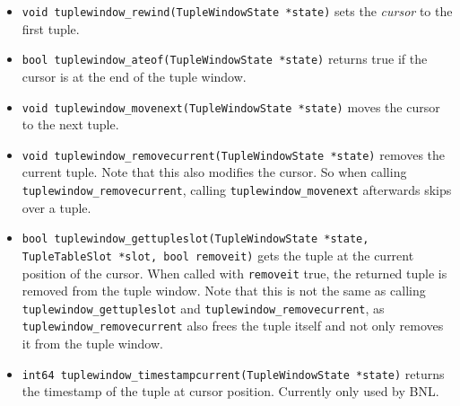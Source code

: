 \begin{itemize}
\item \lstinline|void tuplewindow_rewind(TupleWindowState *state)|
sets the \emph{cursor} to the first tuple.

\item \lstinline|bool tuplewindow_ateof(TupleWindowState *state)|
returns true if the cursor is at the end of the tuple window.

\item \lstinline|void tuplewindow_movenext(TupleWindowState *state)|
moves the cursor to the next tuple.

\item \lstinline|void tuplewindow_removecurrent(TupleWindowState *state)|
removes the current tuple.  Note that this also modifies the cursor.
So when calling \lstinline|tuplewindow_removecurrent|, calling
\lstinline|tuplewindow_movenext| afterwards skips over a tuple.

\item \lstinline|bool tuplewindow_gettupleslot(TupleWindowState *state, TupleTableSlot *slot, bool removeit)|
gets the tuple at the current position of the cursor.  When called with
\lstinline|removeit| true, the returned tuple is removed from the
tuple window.  Note that this is not the same as calling
\lstinline|tuplewindow_gettupleslot| and
\lstinline|tuplewindow_removecurrent|, as
\lstinline|tuplewindow_removecurrent| also frees the tuple itself and
not only removes it from the tuple window.

\item \lstinline|int64 tuplewindow_timestampcurrent(TupleWindowState *state)|
returns the timestamp of the tuple at cursor position.  Currently only
used by BNL.

\end{itemize}




